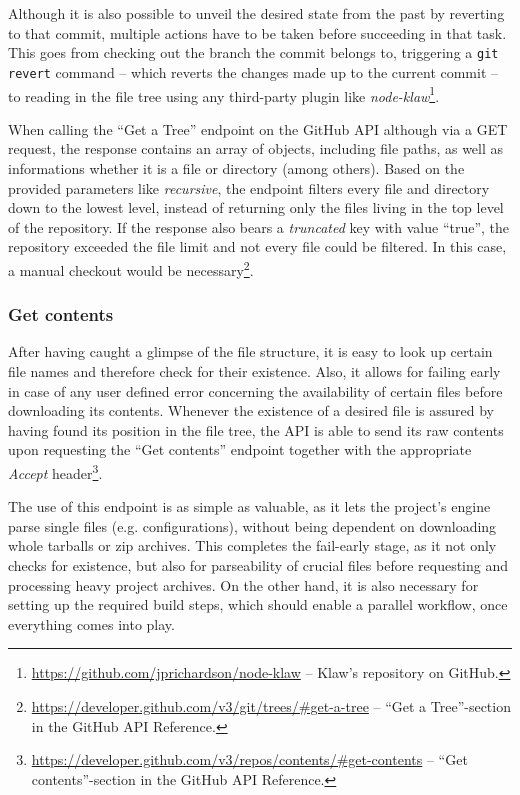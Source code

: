 Although it is also possible to unveil the desired state from the past by reverting to that commit, multiple actions have to be taken before succeeding in that task. This goes from checking out the branch the commit belongs to, triggering a \texttt{git revert} command -- which reverts the changes made up to the current commit \cite{GitRevert} -- to reading in the file tree using any third-party plugin like \emph{node-klaw}\footnote{\url{https://github.com/jprichardson/node-klaw} -- Klaw's repository on GitHub.}.

When calling the ``Get a Tree'' endpoint on the GitHub API although via a GET request, the response contains an array of objects, including file paths, as well as informations whether it is a file or directory (among others). Based on the provided parameters like \emph{recursive}, the endpoint filters every file and directory down to the lowest level, instead of returning only the files living in the top level of the repository. If the response also bears a \emph{truncated} key with value ``true'', the repository exceeded the file limit and not every file could be filtered. In this case, a manual checkout would be necessary\footnote{\url{https://developer.github.com/v3/git/trees/\#get-a-tree} -- ``Get a Tree''-section in the GitHub API Reference.}.

\subsubsection{Get contents}
After having caught a glimpse of the file structure, it is easy to look up certain file names and therefore check for their existence. Also, it allows for failing early in case of any user defined error concerning the availability of certain files before downloading its contents. Whenever the existence of a desired file is assured by having found its position in the file tree, the API is able to send its raw contents upon requesting the ``Get contents'' endpoint together with the appropriate \emph{Accept} header\footnote{\url{https://developer.github.com/v3/repos/contents/\#get-contents} -- ``Get contents''-section in the GitHub API Reference.}.

The use of this endpoint is as simple as valuable, as it lets the project's engine parse single files (e.g. configurations), without being dependent on downloading whole tarballs or zip archives. This completes the fail-early stage, as it not only checks for existence, but also for parseability of crucial files before requesting and processing heavy project archives. On the other hand, it is also necessary for setting up the required build steps, which should enable a parallel workflow, once everything comes into play.

